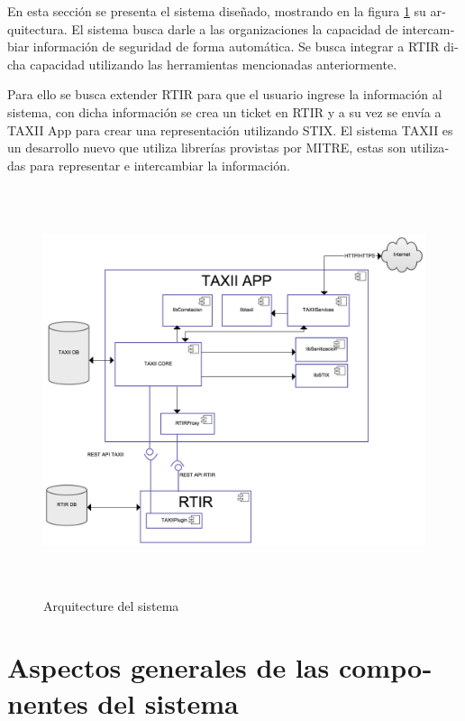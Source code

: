 	\bigskip
	
	\foreignlanguage{spanish}{En esta sección se presenta el sistema diseñado, mostrando en la figura \ref{fig.arquitecturasistema} su arquitectura. El sistema busca darle a las organizaciones la capacidad de intercambiar
		información de seguridad de forma automática. Se busca integrar a RTIR dicha capacidad utilizando las herramientas
		mencionadas anteriormente. }
	
	\bigskip
	
	\foreignlanguage{spanish}{Para ello se busca extender RTIR para que el usuario ingrese la información al sistema, con
		dicha información se crea un ticket en RTIR y a su vez se envía a TAXII App para crear una representación utilizando
		STIX. El sistema TAXII es un desarrollo nuevo que utiliza librerías provistas por MITRE, estas son utilizadas para
		representar e intercambiar la información.}
	
	
	\bigskip
	
	\begin{figure}[ht!]
		\centering
		\includegraphics[width=5.7638in,height=4.6846in]{Diseno21-img/Diseno21-img003.png} 
		\caption{Arquitecture del sistema}	
		\label{fig.arquitecturasistema}
	\end{figure}
	\bigskip
	
	
	\section[Aspectos generales de las componentes del sistema]{\foreignlanguage{spanish}{Aspectos generales de las
			componentes del sistema}}
	
